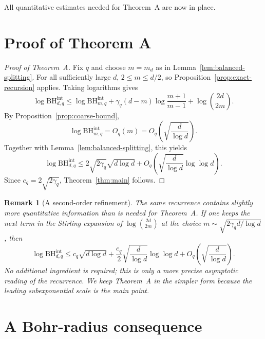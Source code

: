 \documentclass[11pt,a4paper]{article}
\numberwithin{equation}{section}
\theoremstyle{cleanplain}
\theoremstyle{cleandefinition}
\theoremstyle{cleanremark}
\newtheorem{remark}[remark]{Remark}
\newcommand{\BHint}[2]{\mathrm{BH}^{\mathrm{int}}_{#1,#2}}
\begin{document}
All quantitative estimates needed for Theorem~A are now in place.

\section{Proof of Theorem A}\label{sec:proof-main}

\begin{proof}[Proof of Theorem~A]
Fix $q$ and choose $m=m_d$ as in Lemma~\ref{lem:balanced-splitting}.  For all
sufficiently large $d$, $2\leq m\leq d/2$, so Proposition~\ref{prop:exact-recursion}
applies.  Taking logarithms gives
\[
 \log\BHint{d}{q}
 \leq
 \log\BHint{m}{q}
 +\gamma_q(d-m)\log\frac{m+1}{m-1}
 +\log\binom{2d}{2m}.
\]
By Proposition~\ref{prop:coarse-bound},
\[
 \log\BHint{m}{q}=O_q(m)
 =O_q\!\left(\sqrt{\frac d{\log d}}\right).
\]
Together with Lemma~\ref{lem:balanced-splitting}, this yields
\[
 \log\BHint{d}{q}
 \leq
 2\sqrt{2\gamma_q}\sqrt{d\log d}
 +O_q\!\left(\sqrt{\frac d{\log d}}\log\log d\right).
\]
Since $c_q=2\sqrt{2\gamma_q}$, Theorem~\ref{thm:main} follows.
\end{proof}

{\color{black}
\begin{remark}[A second-order refinement]\label{rem:second-order-refinement}
The same recurrence contains slightly more quantitative information than is
needed for Theorem~A.  If one keeps the next term in the Stirling expansion
of \(\log\binom{2d}{2m}\) at the choice
\(m\sim\sqrt{2\gamma_qd/\log d}\), then
\[
 \log\BHint{d}{q}
 \leq c_q\sqrt{d\log d}
 +\frac{c_q}{2}\sqrt{\frac d{\log d}}\log\log d
 +O_q\!\left(\sqrt{\frac d{\log d}}\right).
\]
No additional ingredient is required; this is only a more precise asymptotic
reading of the recurrence.  We keep Theorem~A in the simpler form because the
leading subexponential scale is the main point.
\end{remark}
}


\section{A Bohr-radius consequence}\label{sec:bohr}
\end{document}
